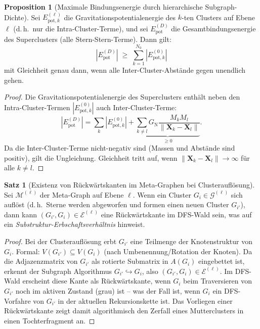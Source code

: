 ﻿\documentclass[a4paper,12pt]{report}
\theoremstyle{definition}
\newtheorem{satz}{Satz}
\newtheorem{proposition}{Proposition}
\begin{document}
\begin{proposition}[Maximale Bindungsenergie durch hierarchische Subgraph-Dichte]
\label{prop:max_bind}
Sei $E^{(\ell)}_{\mathrm{pot},k}$ die Gravitationspotentialenergie des $k$-ten Clusters auf Ebene~$\ell$ (d.\,h.\ nur die Intra-Cluster-Terme), und sei $E^{(D)}_\mathrm{pot}$ die Gesamtbindungsenergie des Superclusters (alle Stern-Stern-Terme). Dann gilt:
\[
|E^{(D)}_\mathrm{pot}| \;\geq\; \sum_{k=1}^{N_0} |E^{(0)}_{\mathrm{pot},k}|
\]
mit Gleichheit genau dann, wenn alle Inter-Cluster-Abstände gegen unendlich gehen.
\end{proposition}

\begin{proof}
Die Gravitationspotentialenergie des Superclusters enthält neben den Intra-Cluster-Termen $|E^{(0)}_{\mathrm{pot},k}|$ auch Inter-Cluster-Terme:
\[
|E^{(D)}_\mathrm{pot}| = \sum_{k} |E^{(0)}_{\mathrm{pot},k}|
+ \underbrace{\sum_{k \neq l} G_\mathrm{N} \frac{M_k M_l}{\|\mathbf{X}_k - \mathbf{X}_l\|}}_{\geq 0}.
\]
Da die Inter-Cluster-Terme nicht-negativ sind (Massen und Abstände sind positiv), gilt die Ungleichung. Gleichheit tritt auf, wenn $\|\mathbf{X}_k - \mathbf{X}_l\| \to \infty$ für alle $k \neq l$.
\end{proof}

\begin{satz}[Existenz von Rückwärtskanten im Meta-Graphen bei Clusterauflösung]
\label{satz:rueckwaertskanten}
Sei $\mathcal{M}^{(\ell)}$ der Meta-Graph auf Ebene $\ell$. Wenn ein Cluster $G_i \in \mathcal{G}^{(\ell)}$ sich auflöst (d.\,h.\ Sterne werden abgeworfen und formen einen neuen Cluster $G_{i'}$), dann kann $(G_{i'}, G_i) \in \mathcal{E}^{(\ell)}$ eine Rückwärtskante im DFS-Wald sein, was auf ein \emph{Substruktur-Erbschaftsverhältnis} hinweist.
\end{satz}

\begin{proof}
Bei der Clusterauflösung erbt $G_{i'}$ eine Teilmenge der Knotenstruktur von $G_i$. Formal: $V(G_{i'}) \subseteq V(G_i)$ (nach Umbenennung/Rotation der Knoten). Da die Adjazenzmatrix von $G_{i'}$ als rotierte Submatrix in $A(G_i)$ eingebettet ist, erkennt der Subgraph Algorithmus $G_{i'} \hookrightarrow G_i$, also $(G_{i'}, G_i) \in \mathcal{E}^{(\ell)}$. Im DFS-Wald erscheint diese Kante als Rückwärtskante, wenn $G_i$ beim Traversieren von $G_{i'}$ noch im aktiven Zustand (grau) ist -- was der Fall ist, wenn $G_i$ ein DFS-Vorfahre von $G_{i'}$ in der aktuellen Rekursionskette ist. Das Vorliegen einer Rückwärtskante zeigt damit algorithmisch den Zerfall eines Mutterclusters in einen Tochterfragment an.
\end{proof}
\end{document}
